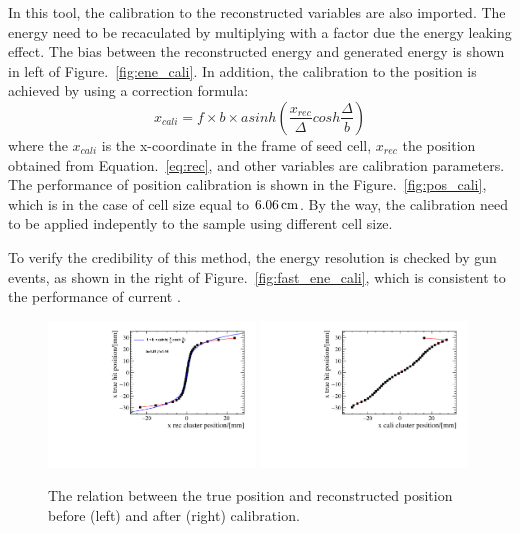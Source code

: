 In this tool,
the calibration to the reconstructed variables are also imported.
The energy need to be recaculated by multiplying with a factor due the energy leaking effect.
The bias between the reconstructed energy and generated energy is shown in left of Figure.~\ref{fig:ene_cali}.
In addition,
the calibration to the position is achieved by using a correction formula:
\begin{equation}
\label{eq:pos_cali}
x_{cali} = f \times b \times asinh(\frac{x_{rec}}{\Delta}cosh\frac{\Delta}{b})
\end{equation}
where the $x_{cali}$ is the x-coordinate in the frame of seed cell,
$x_{rec}$ the position obtained from Equation.~\ref{eq:rec},
and other variables are calibration parameters.
The performance of position calibration is shown in the Figure.~\ref{fig:pos_cali},
which is in the case of cell size equal to $6.06\text{\,cm}$.
By the way,
the calibration need to be applied indepently to the sample using different cell size.

To verify the credibility of this method, 
the energy resolution is checked by \g gun events,
as shown in the right of Figure.~\ref{fig:fast_ene_cali},
which is consistent to the performance of current \ecal.

\begin{figure}[!thbp]
\centering
\includegraphics[width=0.49\textwidth]{Figures/06_ECAL/fast_sim/for_fast_cali/S_correction/before/middle_cor.pdf}
\includegraphics[width=0.49\textwidth]{Figures/06_ECAL/fast_sim/for_fast_cali/S_correction/after/middle_cor.pdf}
   \caption{The relation between the true position and reconstructed position before (left) and after (right) calibration.}
\label{fig:fast_pos_cali}
\end{figure}



